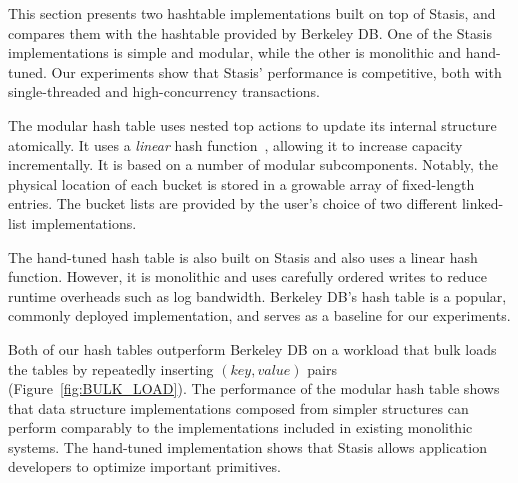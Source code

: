 \documentclass[letterpaper,twocolumn,10pt]{article}
\newcommand{\yad}{Stasis\xspace}
\newcommand{\yads}{Stasis'\xspace}
\begin{document}
This section presents two hashtable implementations built on top of
\yad, and compares them with the hashtable provided by Berkeley DB.
One of the \yad implementations is simple and modular, while
the other is monolithic and hand-tuned.  Our experiments show that
\yads performance is competitive, both with single-threaded and
high-concurrency transactions.


The modular hash table uses nested top actions to update its internal
structure atomically.  It uses a {\em linear} hash
function~\cite{lht}, allowing it to increase capacity incrementally.
It is based on a number of modular subcomponents.  Notably, the
physical location of each bucket is stored in a growable array of
fixed-length entries.  The bucket lists are provided by the user's
choice of two different linked-list implementations.

The hand-tuned hash table is also built on \yad and also uses a linear hash
function.  However, it is monolithic and uses carefully ordered writes to
reduce runtime overheads such as log bandwidth.  Berkeley DB's
hash table is a popular, commonly deployed implementation, and serves
as a baseline for our experiments.

Both of our hash tables outperform Berkeley DB on a workload that bulk
loads the tables by repeatedly inserting $(key, value)$ pairs
(Figure~\ref{fig:BULK_LOAD}).
The performance of the modular hash table shows that
data structure implementations composed from
simpler structures can perform comparably to the implementations included 
in existing monolithic systems.  The hand-tuned
implementation shows that \yad allows application developers to
optimize important primitives.
\end{document}
